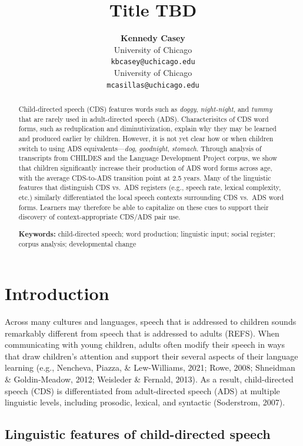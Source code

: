 \documentclass[10pt, letterpaper]{article}
\title{Title TBD}
\author{{\large \bf Kennedy Casey} \\ University of Chicago \\ \texttt{kbcasey@uchicago.edu} \And {\large \bf Marisa Casillas} \\ University of Chicago \\ \texttt{mcasillas@uchicago.edu}}
\begin{document}
\maketitle

\begin{abstract}
Child-directed speech (CDS) features words such as \emph{doggy},
\emph{night-night}, and \emph{tummy} that are rarely used in
adult-directed speech (ADS). Characterisitcs of CDS word forms, such as
reduplication and diminutivization, explain why they may be learned and
produced earlier by children. However, it is not yet clear how or when
children switch to using ADS equivalents---\emph{dog}, \emph{goodnight},
\emph{stomach}. Through analysis of transcripts from CHILDES and the
Language Development Project corpus, we show that children significantly
increase their production of ADS word forms across age, with the average
CDS-to-ADS transition point at 2.5 years. Many of the linguistic
features that distinguish CDS vs.~ADS registers (e.g., speech rate,
lexical complexity, etc.) similarly differentiated the local speech
contexts surrounding CDS vs.~ADS word forms. Learners may therefore be
able to capitalize on these cues to support their discovery of
context-appropriate CDS/ADS pair use.

\textbf{Keywords:}
child-directed speech; word production; linguistic input; social
register; corpus analysis; developmental change
\end{abstract}

\hypertarget{introduction}{%
\section{Introduction}\label{introduction}}

Across many cultures and languages, speech that is addressed to children
sounds remarkably different from speech that is addressed to adults
(REFS). When communicating with young children, adults often modify
their speech in ways that draw children's attention and support their
several aspects of their language learning (e.g., Nencheva, Piazza, \&
Lew-Williams, 2021; Rowe, 2008; Shneidman \& Goldin-Meadow, 2012;
Weisleder \& Fernald, 2013). As a result, child-directed speech (CDS) is
differentiated from adult-directed speech (ADS) at multiple linguistic
levels, including prosodic, lexical, and syntactic (Soderstrom, 2007).

\hypertarget{linguistic-features-of-child-directed-speech}{%
\subsection{Linguistic features of child-directed
speech}\label{linguistic-features-of-child-directed-speech}}
\end{document}
